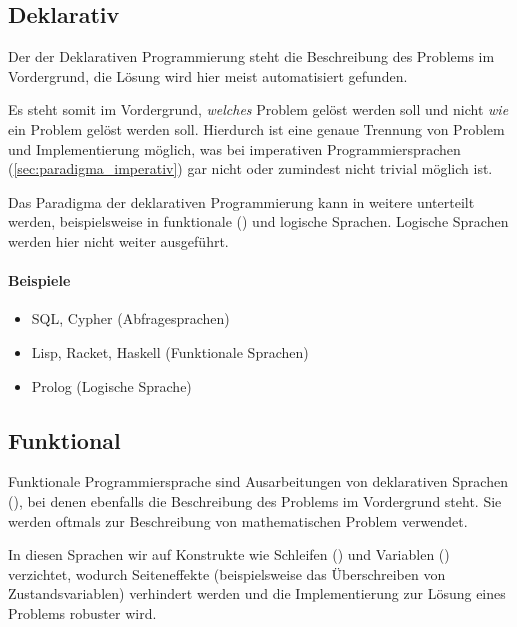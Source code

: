 \subsection{Deklarativ}

    Der der Deklarativen Programmierung steht die Beschreibung des Problems im Vordergrund, die Lösung wird hier meist automatisiert gefunden.
    
    Es steht somit im Vordergrund, \textit{welches} Problem gelöst werden soll und nicht \textit{wie} ein Problem gelöst werden soll. Hierdurch ist eine genaue Trennung von Problem und Implementierung möglich, was bei imperativen Programmiersprachen (\ref{sec:paradigma_imperativ}) gar nicht oder zumindest nicht trivial möglich ist.
    
    Das Paradigma der deklarativen Programmierung kann in weitere unterteilt werden, beispielsweise in funktionale () und logische Sprachen. Logische Sprachen werden hier nicht weiter ausgeführt.
    
    \paragraph{Beispiele}
        \begin{itemize}
            \item SQL, Cypher (Abfragesprachen)
            \item Lisp, Racket, Haskell (Funktionale Sprachen)
            \item Prolog (Logische Sprache)
        \end{itemize}

\subsection{Funktional}

    Funktionale Programmiersprache sind Ausarbeitungen von deklarativen Sprachen (), bei denen ebenfalls die Beschreibung des Problems im Vordergrund steht. Sie werden oftmals zur Beschreibung von mathematischen Problem verwendet.
    
    In diesen Sprachen wir auf Konstrukte wie Schleifen () und Variablen () verzichtet, wodurch Seiteneffekte (beispielsweise das Überschreiben von Zustandsvariablen) verhindert werden und die Implementierung zur Lösung eines Problems robuster wird.
    
